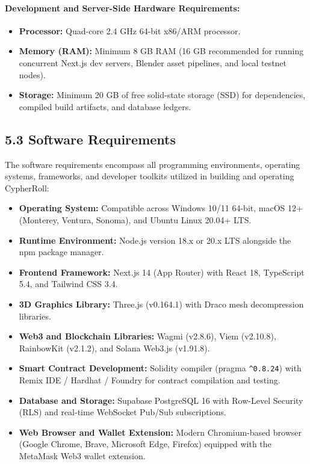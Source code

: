 \paragraph{Development and Server-Side Hardware Requirements:}
\begin{itemize}[leftmargin=1.5em]
    \item \textbf{Processor:} Quad-core 2.4 GHz 64-bit x86/ARM processor.
    \item \textbf{Memory (RAM):} Minimum 8 GB RAM (16 GB recommended for running concurrent Next.js dev servers, Blender asset pipelines, and local testnet nodes).
    \item \textbf{Storage:} Minimum 20 GB of free solid-state storage (SSD) for dependencies, compiled build artifacts, and database ledgers.
\end{itemize}

\subsection*{5.3 Software Requirements}
The software requirements encompass all programming environments, operating systems, frameworks, and developer toolkits utilized in building and operating CypherRoll:
\begin{itemize}[leftmargin=1.5em]
    \item \textbf{Operating System:} Compatible across Windows 10/11 64-bit, macOS 12+ (Monterey, Ventura, Sonoma), and Ubuntu Linux 20.04+ LTS.
    \item \textbf{Runtime Environment:} Node.js version 18.x or 20.x LTS alongside the npm package manager.
    \item \textbf{Frontend Framework:} Next.js 14 (App Router) with React 18, TypeScript 5.4, and Tailwind CSS 3.4.
    \item \textbf{3D Graphics Library:} Three.js (v0.164.1) with Draco mesh decompression libraries.
    \item \textbf{Web3 and Blockchain Libraries:} Wagmi (v2.8.6), Viem (v2.10.8), RainbowKit (v2.1.2), and Solana Web3.js (v1.91.8).
    \item \textbf{Smart Contract Development:} Solidity compiler (pragma \texttt{\^{}0.8.24}) with Remix IDE / Hardhat / Foundry for contract compilation and testing.
    \item \textbf{Database and Storage:} Supabase PostgreSQL 16 with Row-Level Security (RLS) and real-time WebSocket Pub/Sub subscriptions.
    \item \textbf{Web Browser and Wallet Extension:} Modern Chromium-based browser (Google Chrome, Brave, Microsoft Edge, Firefox) equipped with the MetaMask Web3 wallet extension.
\end{itemize}

